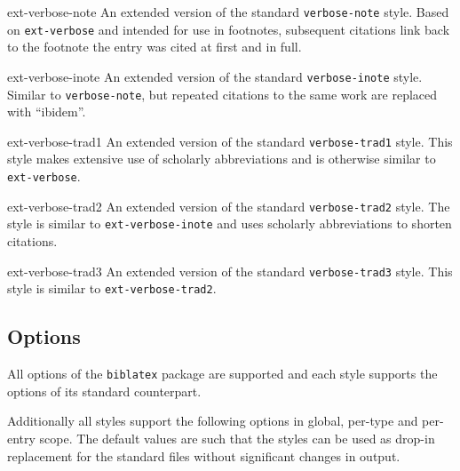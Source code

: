 \documentclass{ltxdockit}
\def\sty{\texttt}
\begin{document}
\begin{marglist}
\item[ext-verbose-note]
An extended version of the standard \sty{verbose-note} style.
Based on \sty{ext-verbose} and intended for use in footnotes, subsequent
citations link back to the footnote the entry was cited at first and in full.

\item[ext-verbose-inote]
An extended version of the standard \sty{verbose-inote} style.
Similar to \sty{verbose-note}, but repeated citations to the same work are
replaced with \enquote{ibidem}.

\item[ext-verbose-trad1]
An extended version of the standard \sty{verbose-trad1} style.
This style makes extensive use of scholarly abbreviations and is otherwise
similar to \sty{ext-verbose}.

\item[ext-verbose-trad2]
An extended version of the standard \sty{verbose-trad2} style.
The style is similar to \sty{ext\hyp{}verbose\hyp{}inote} and
uses scholarly abbreviations to shorten citations.

\item[ext-verbose-trad3]
An extended version of the standard \sty{verbose-trad3} style.
This style is similar to \sty{ext\hyp{}verbose\hyp{}trad2}.
\end{marglist}


\subsection{Options}
All options of the \sty{biblatex} package are supported and each style supports
the options of its standard counterpart.

Additionally all styles support the following options in global, per-type and
per-entry scope.
The default values are such that the styles can be used as drop-in replacement
for the standard files without significant changes in output.
\end{document}
